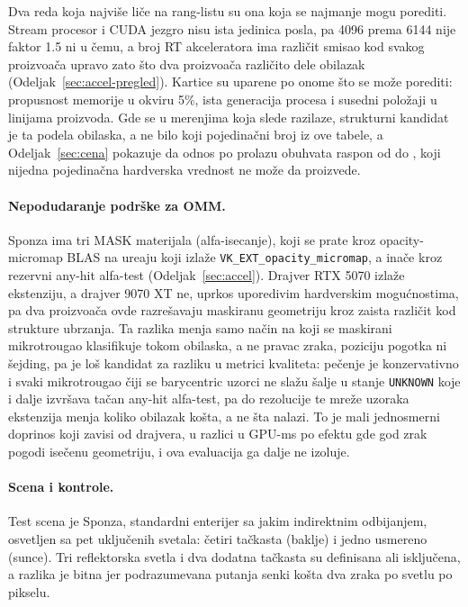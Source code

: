 Dva reda koja najvi\v{s}e li\v{c}e na rang-listu su ona koja se najmanje mogu porediti. Stream procesor
i CUDA jezgro nisu ista jedinica posla, pa 4096 prema 6144 nije faktor 1.5 ni u \v{c}emu, a broj RT
akceleratora ima razli\v{c}it smisao kod svakog proizvo\dj a\v{c}a upravo zato \v{s}to dva proizvo\dj a\v{c}a razli\v{c}ito dele
obilazak (Odeljak~\ref{sec:accel-pregled}). Kartice su uparene po onome \v{s}to se mo\v{z}e porediti:
propusnost memorije u okviru 5\%, ista generacija procesa i susedni polo\v{z}aji u linijama proizvoda. Gde se u merenjima koja slede razilaze,
strukturni kandidat je ta podela obilaska, a ne bilo koji pojedinačni broj iz ove tabele, a
Odeljak~\ref{sec:cena} pokazuje da odnos po prolazu obuhvata raspon od \perfRatioMin{} do \perfRatioMax{}, koji nijedna
pojedina\v{c}na hardverska vrednost ne mo\v{z}e da proizvede.

\paragraph{Nepodudaranje podr\v{s}ke za OMM.} Sponza ima tri MASK materijala (alfa-isecanje), koji se prate
kroz opacity-micromap BLAS na ure\dj{}aju koji izla\v{z}e \texttt{VK\_EXT\_opacity\_micromap}, a inače
kroz rezervni any-hit alfa-test (Odeljak~\ref{sec:accel}). Drajver RTX 5070 izla\v{z}e ekstenziju, a drajver 9070 XT ne, uprkos uporedivim hardverskim mogu\'cnostima, pa
dva proizvo\dj a\v{c}a ovde razre\v{s}avaju maskiranu geometriju kroz zaista razli\v{c}it kod strukture ubrzanja. Ta
razlika menja samo na\v{c}in na koji se maskirani mikrotrougao klasifikuje tokom obilaska, a ne pravac zraka,
poziciju pogotka ni \v{s}ejding, pa je lo\v{s} kandidat za razliku u metrici kvaliteta: pe\v{c}enje je
konzervativno i svaki mikrotrougao \v{c}iji se barycentric uzorci ne sla\v{z}u \v{s}alje u stanje
\texttt{UNKNOWN} koje i dalje izvr\v{s}ava ta\v{c}an any-hit alfa-test, pa do rezolucije te mre\v{z}e uzoraka
ekstenzija menja koliko obilazak ko\v{s}ta, a ne \v{s}ta nalazi. To je mali jednosmerni doprinos koji zavisi od drajvera, u razlici u GPU-ms po efektu gde god zrak pogodi isečenu
geometriju, i ova evaluacija ga dalje ne izoluje.

\paragraph{Scena i kontrole.} Test scena je Sponza, standardni enterijer sa jakim indirektnim
odbijanjem, osvetljen sa pet uklju\v{c}enih svetala: \v{c}etiri ta\v{c}kasta (baklje) i jedno usmereno (sunce). Tri reflektorska svetla i
dva dodatna ta\v{c}kasta su definisana ali isklju\v{c}ena, a razlika je bitna jer podrazumevana
putanja senki ko\v{s}ta dva zraka po svetlu po pikselu.

